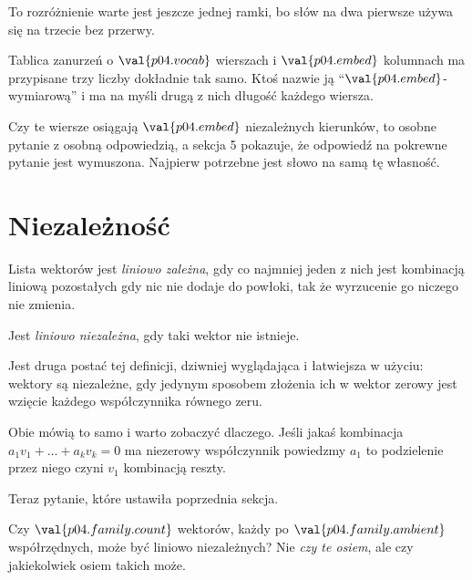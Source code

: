\begin{fr}

To rozróżnienie warte jest jeszcze jednej ramki, bo słów na dwa pierwsze
używa się na trzecie bez przerwy.

Tablica zanurzeń o $\val{p04.vocab}$ wierszach i $\val{p04.embed}$ kolumnach ma
przypisane trzy liczby dokładnie tak samo. Ktoś nazwie ją
\enquote{$\val{p04.embed}$-wymiarową} i ma na myśli drugą z nich \dash{}
długość każdego wiersza.

Czy te wiersze osiągają $\val{p04.embed}$ niezależnych kierunków, to osobne
pytanie z osobną odpowiedzią, a sekcja 5 pokazuje, że odpowiedź na pokrewne
pytanie jest wymuszona. Najpierw potrzebne jest słowo na samą tę własność.
\end{fr}

\section{Niezależność}
\label{sec:P04-independence}

\begin{fr}
Lista wektorów jest \emph{liniowo zależna}, gdy co najmniej jeden z nich jest
kombinacją liniową pozostałych \dash{} gdy nic nie dodaje do powłoki, tak że
wyrzucenie go niczego nie zmienia.

Jest \emph{liniowo niezależna}, gdy taki wektor nie istnieje.

Jest druga postać tej definicji, dziwniej wyglądająca i łatwiejsza w użyciu:
wektory są niezależne, gdy jedynym sposobem złożenia ich w wektor zerowy jest
wzięcie każdego współczynnika równego zeru.

Obie mówią to samo i warto zobaczyć dlaczego. Jeśli jakaś kombinacja
$a_1 v_1 + \dots + a_k v_k = 0$ ma niezerowy współczynnik \dash{} powiedzmy
$a_1$ \dash{} to podzielenie przez niego czyni $v_1$ kombinacją reszty.
\end{fr}

\begin{fr}
Teraz pytanie, które ustawiła poprzednia sekcja.

Czy $\val{p04.family.count}$ wektorów, każdy po $\val{p04.family.ambient}$
współrzędnych, może być liniowo niezależnych? Nie \emph{czy te osiem}, ale czy
jakiekolwiek osiem takich może.
\nextframe
\end{fr}

